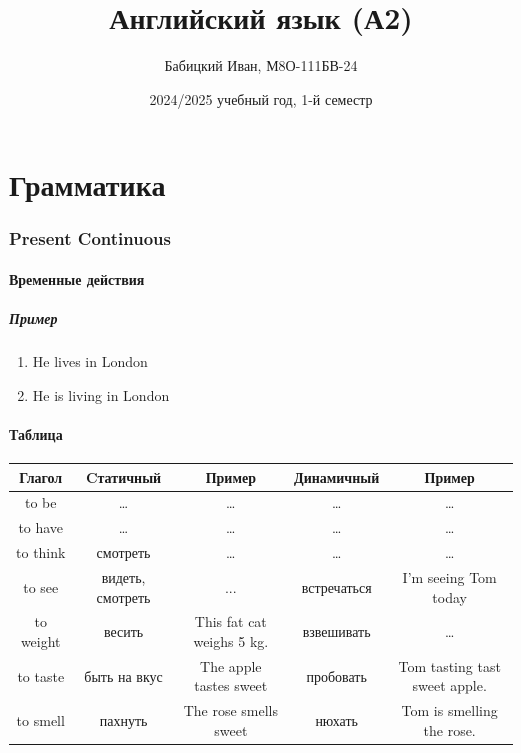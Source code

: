 \documentclass{article}
\begin{document}
\begin{titlepage}
    \title{Английский язык (А2)}
    \author{Бабицкий Иван, М8О-111БВ-24}
    \date{2024/2025 учебный год, 1-й семестр}
    \maketitle
\end{titlepage}

\tableofcontents



\part{Грамматика}

\section{Present Continuous}

\subsection{Временные действия}

\subsubsection{Пример}
\begin{enumerate}
    \item He lives in London
    \item He is living in London
\end{enumerate}

\subsection{Таблица}
\begin{tabular}{c|c|c|c|c}
    Глагол & Cтатичный & Пример & Динамичный & Пример \\
    \hline
    to be & \dots & \dots & \dots & \dots \\
    to have & \dots & \dots & \dots & \dots \\
    to think & смотреть & \dots & \dots & \dots \\
    to see & видеть, смотреть & ... & встречаться & I'm seeing Tom today \\
    to weight & весить & This fat cat weighs 5 kg. & взвешивать & \dots \\
    to taste & быть на вкус & The apple tastes sweet & пробовать & Tom tasting tast sweet apple. \\
    to smell & пахнуть & The rose smells sweet & нюхать & Tom is smelling the rose.
\end{tabular}
\end{document}
